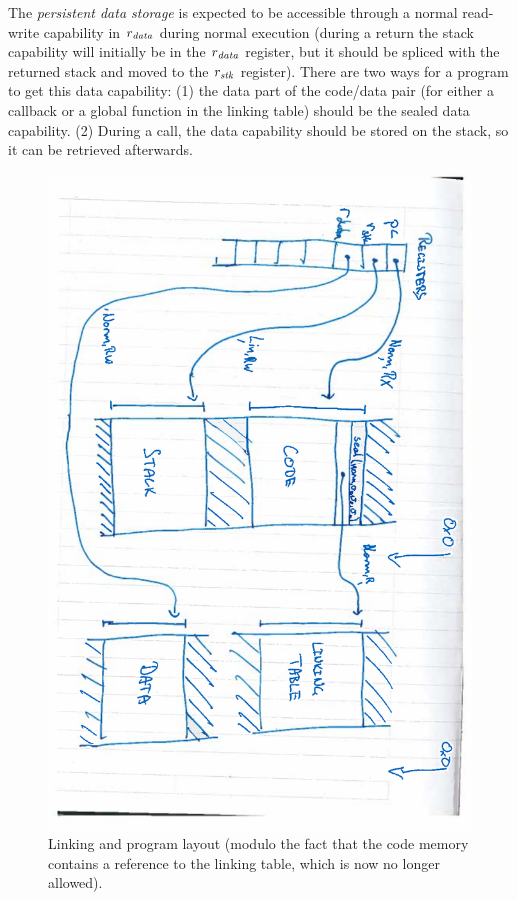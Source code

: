 \documentclass[a4paper]{article}
\begin{document}
The \emph{persistent data storage} is expected to be accessible through a normal read-write capability in $r_{\mathit{data}}$ during normal execution (during a return the stack capability will initially be in the $r_{\mathit{data}}$ register, but it should be spliced with the returned stack and moved to the $r_{\mathit{stk}}$ register). There are two ways for a program to get this data capability: (1) the data part of the code/data pair (for either a callback or a global function in the linking table) should be the sealed data capability. (2) During a call, the data capability should be stored on the stack, so it can be retrieved afterwards.
\begin{figure}
  \centering
  \includegraphics[angle=90,width=\textwidth]{img/linking.pdf}
  \caption{Linking and program layout (modulo the fact that the code memory contains a reference to the linking table, which is now no longer allowed).}
  \label{fig:trg-prog-link}
\end{figure}
\end{document}
